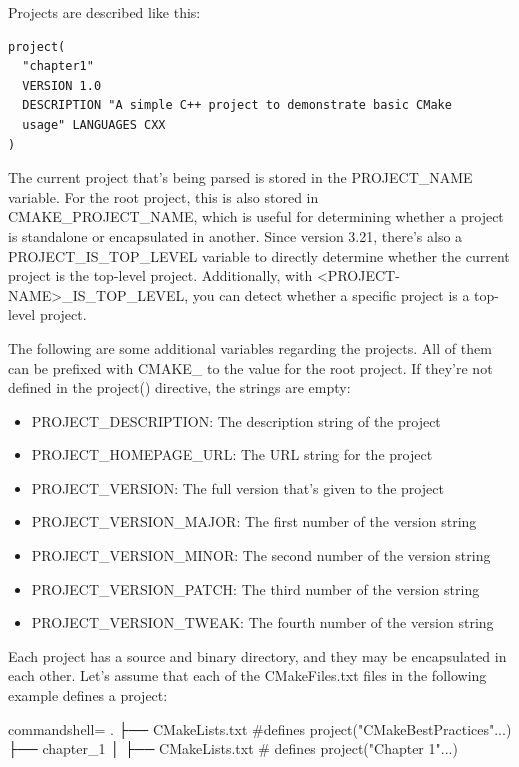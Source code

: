 Projects are described like this:

\begin{lstlisting}[style=styleCMake]
project(
  "chapter1"
  VERSION 1.0
  DESCRIPTION "A simple C++ project to demonstrate basic CMake
  usage" LANGUAGES CXX
)
\end{lstlisting}

The current project that's being parsed is stored in the PROJECT\_NAME variable. For the root project, this is also stored in CMAKE\_PROJECT\_NAME, which is useful for determining whether a project is standalone or encapsulated in another. Since version 3.21, there's also a PROJECT\_IS\_TOP\_LEVEL variable to directly determine whether the current project is the top-level project. Additionally, with <PROJECT-NAME>\_IS\_TOP\_LEVEL, you can detect whether a specific project is a top-level project.

The following are some additional variables regarding the projects. All of them can be prefixed with CMAKE\_ to the value for the root project. If they're not defined in the project() directive, the strings are empty:

\begin{itemize}
\item 
PROJECT\_DESCRIPTION: The description string of the project

\item 
PROJECT\_HOMEPAGE\_URL: The URL string for the project

\item 
PROJECT\_VERSION: The full version that's given to the project

\item 
PROJECT\_VERSION\_MAJOR: The first number of the version string

\item 
PROJECT\_VERSION\_MINOR: The second number of the version string

\item 
PROJECT\_VERSION\_PATCH: The third number of the version string

\item 
PROJECT\_VERSION\_TWEAK: The fourth number of the version string
\end{itemize}

Each project has a source and binary directory, and they may be encapsulated in each other. Let's assume that each of the CMakeFiles.txt files in the following example defines a project:

\begin{tcblisting}{commandshell={}}
.
├── CMakeLists.txt #defines project("CMakeBestPractices"...)
├── chapter_1
│      ├── CMakeLists.txt # defines project("Chapter 1"...)
\end{tcblisting}

